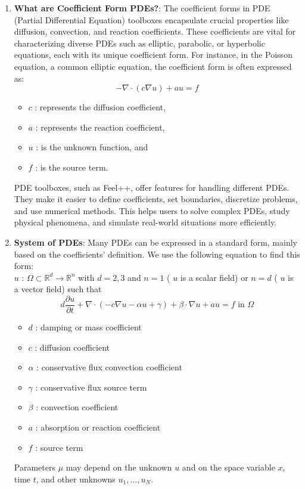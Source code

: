 \documentclass[12pt]{article}
\begin{document}
\begin{enumerate}
    \item \textbf{What are Coefficient Form PDEs?}: The coefficient forms in PDE (Partial Differential Equation) toolboxes encapsulate crucial properties like diffusion, convection, and reaction coefficients. These coefficients are vital for characterizing diverse PDEs such as elliptic, parabolic, or hyperbolic equations, each with its unique coefficient form.
    For instance, in the Poisson equation, a common elliptic equation, the coefficient form is often expressed as:
    \[
        -\nabla \cdot (c \nabla u) + au = f
    \]

    \begin{itemize}
        \item \(c\) : represents the diffusion coefficient,
        \item \(a\) : represents the reaction coefficient,
        \item \(u\) : is the unknown function, and
        \item \(f\) : is the source term.
    \end{itemize}
    
    PDE toolboxes, such as Feel++, offer features for handling different PDEs. They make it easier to define coefficients, set boundaries, discretize problems, and use numerical methods. This helps users to solve complex PDEs, study physical phenomena, and simulate real-world situations more efficiently.

    \item \textbf{System of PDEs}: Many PDEs can be expressed in a standard form, mainly based on the coefficients' definition. We use the following equation to find this form: \\
    \( u \) : \( \Omega \subset \mathbb{R}^d \longrightarrow \mathbb{R}^n \) with \( d = 2, 3 \) and \( n = 1 \) ( \( u \) is a scalar field) or \( n = d \) ( \( u \) is a vector field) such that
    \[
    d \frac{\partial u}{\partial t} + \nabla \cdot \left( -c \nabla u - \alpha u + \gamma \right) + \beta \cdot \nabla u + au = f \text{ in } \Omega
    \]
    \begin{itemize}
        \item \( d \) : damping or mass coefficient
        \item \( c \) : diffusion coefficient
        \item \( \alpha \) : conservative flux convection coefficient
        \item \( \gamma \) : conservative flux source term
        \item \( \beta \) : convection coefficient
        \item \( a \) : absorption or reaction coefficient
        \item \( f \) : source term
    \end{itemize}
    Parameters \( \mu \) may depend on the unknown \( u \) and on the space variable \( x \), time \( t \), and other unknowns \( u_1, \ldots, u_N \).
\newpage


\end{enumerate}
\end{document}
